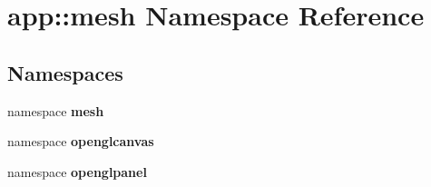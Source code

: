\section{app::mesh Namespace Reference}
\label{namespaceapp_1_1mesh}


\subsection*{Namespaces}
\begin{CompactItemize}
\item 
namespace {\bf mesh}
\item 
namespace {\bf openglcanvas}
\item 
namespace {\bf openglpanel}
\end{CompactItemize}
